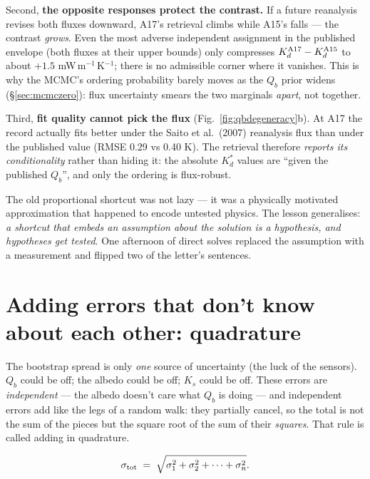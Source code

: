 \documentclass[11pt]{report}
\begin{document}
Second, \textbf{the opposite responses protect the contrast.} If a future
reanalysis revises both fluxes downward, A17's retrieval climbs while A15's
falls --- the contrast \emph{grows}. Even the most adverse independent
assignment in the published envelope (both fluxes at their upper bounds)
only compresses $K_d^{\rm A17}-K_d^{\rm A15}$ to about $+1.5$
mW\,m$^{-1}$\,K$^{-1}$; there is no admissible corner where it vanishes.
This is why the MCMC's ordering probability barely moves as the $Q_b$ prior
widens (\S\ref{sec:mcmczero}): flux uncertainty smears the two marginals
\emph{apart}, not together.

Third, \textbf{fit quality cannot pick the flux}
(Fig.~\ref{fig:qbdegeneracy}b). At A17 the record actually fits better
under the Saito et al.\ (2007) reanalysis flux than under the published value
(RMSE 0.29 vs 0.40 K). The retrieval therefore \emph{reports its
conditionality} rather than hiding it: the absolute $K_d^{*}$ values are
``given the published $Q_b$'', and only the ordering is flux-robust.

\begin{warn}
The old proportional shortcut was not lazy --- it was a physically motivated
approximation that happened to encode untested physics. The lesson
generalises: \emph{a shortcut that embeds an assumption about the solution
is a hypothesis, and hypotheses get tested}. One afternoon of direct solves
replaced the assumption with a measurement and flipped two of the letter's
sentences.
\end{warn}

\section{Adding errors that don't know about each other:
quadrature}\label{sec:quadzero}

\begin{plain}
The bootstrap spread is only \emph{one} source of uncertainty (the luck of the
sensors). $Q_b$ could be off; the albedo could be off; $K_s$ could be off.
These errors are \emph{independent} --- the albedo doesn't care what $Q_b$ is
doing --- and independent errors add like the legs of a random walk: they
partially cancel, so the total is not the sum of the pieces but the square
root of the sum of their \emph{squares}. That rule is called adding in
quadrature.
\end{plain}

\[
\sigma_{\rm tot} \;=\; \sqrt{\sigma_1^2 + \sigma_2^2 + \cdots + \sigma_n^2}.
\]
\end{document}
